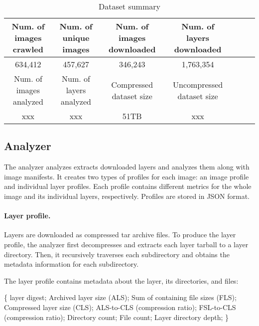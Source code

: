 \begin{table*}
	\centering
	\caption{Dataset summary} \label{tab-dataset-summary}
	\begin{tabular}{c|c|c|c|c|c|c}%
		\hline
		Num. of images crawled & Num. of unique images    & Num. of images downloaded  & Num. of layers downloaded \\
		\hline
		634,412                 & 457,627                 & 346,243                    & 1,763,354  \\
		\hline
		Num. of images analyzed & Num. of layers analyzed & Compressed dataset size              &  Uncompressed dataset size \\
		\hline
		xxx                     & xxx                     & 51TB                        & xxx  \\
		\hline
	\end{tabular}
\end{table*}

\subsection{Analyzer}
\label{sec:analyzer}

The analyzer analyzes extracts downloaded layers
and analyzes them along with image manifests.
It creates two types of profiles for each image:
an image profile and individual layer profiles.
Each profile contains different metrics for the whole image and
its individual layers, respectively.
Profiles are stored in JSON format.


%
%

\paragraph{Layer profile.}

Layers are downloaded as compressed tar archive files.
%
To produce the layer profile, the analyzer first decompresses and extracts each
layer tarball to a layer directory.
%
Then, it recursively traverses each subdirectory and obtains
the metadata information for each subdirectory.

The layer profile contains metadata about the layer, its directories,
and files: 

\{
layer digest; 
Archived layer size (ALS); 
Sum of containing file sizes (FLS); 
Compressed layer size (CLS); 
ALS-to-CLS (compression ratio);
FSL-to-CLS (compression ratio);
Directory count;
File count;
Layer directory depth;
\}

